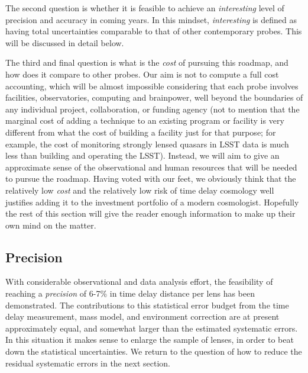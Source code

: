 The second question is whether it is feasible to achieve an {\it
interesting} level of precision and accuracy in coming years. In this
mindset, {\it interesting} is defined as having total uncertainties
comparable to that of other contemporary probes. This will be
discussed in detail below.

The third and final question is what is the {\it cost} of pursuing
this roadmap, and how does it compare to other probes. Our aim is not
to compute a full cost accounting, which will be almost impossible
considering that each probe involves facilities, observatories,
computing and brainpower, well beyond the boundaries of any individual
project, collaboration, or funding agency (not to mention that the
marginal cost of adding a technique to an existing program or
facility is very different from what the cost of building a facility
just for that purpose; for example, the cost of monitoring strongly
lensed quasars in LSST data is much less than building and operating
the LSST). Instead, we will aim to give an approximate sense of the
observational and human resources that will be needed to pursue the
roadmap. Having voted with our feet, we obviously think that the
relatively low {\it cost} and the relatively low risk of time delay
cosmology well justifies adding it to the investment portfolio of a
modern cosmologist. Hopefully the rest of this section will give the
reader enough information to make up their own mind on the matter.



\subsection{Precision}
\label{ssec:precision}

With considerable observational and data analysis effort, the
feasibility of reaching a {\it precision} of 6-7\% in time delay distance
per lens has been demonstrated. The contributions to this statistical
error budget
from the time delay measurement, mass model, and environment
correction are at present approximately equal, and somewhat larger than
the estimated systematic errors. In this situation it makes sense to
enlarge the sample of lenses, in order to beat down the statistical
uncertainties. We return to the question of how to reduce the residual
systematic errors in the next section.

